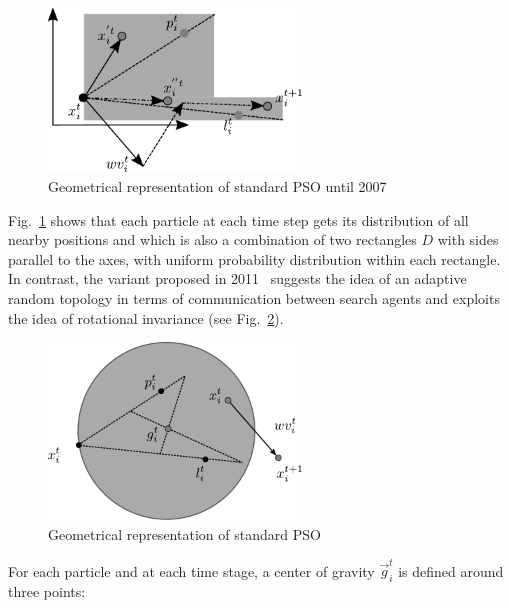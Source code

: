 \begin{figure} [H]
\centering
    \includegraphics[width=0.60\textwidth]{Part 2 - Search-Based Optimization/Particle Swarm Optimization/Images/SPSO2011-1.pdf}
    \caption{Geometrical representation of standard PSO until 2007}
    \label{fig:STANDARDPSO_1}
\end{figure}


    
Fig.~\ref{fig:STANDARDPSO_1} shows that each particle at each time step gets its distribution of all nearby positions and which is also a combination of two rectangles $D$ with sides parallel to the axes, with uniform probability distribution within each rectangle. In contrast, the variant proposed in 2011~\cite{clerc2012beyond} suggests the idea of an adaptive random topology in terms of communication between search agents and exploits the idea of rotational invariance (see Fig.~\ref{fig:STANDARDPSO}).


\begin{figure} [H]
\centering
    \includegraphics[width=0.60\textwidth]{Part 2 - Search-Based Optimization/Particle Swarm Optimization/Images/SPSO2011.pdf}
    \caption{Geometrical representation of standard PSO}
    \label{fig:STANDARDPSO}
\end{figure}



For each particle and at each time stage, a center of gravity ${\vec{g}}_i^t$ is defined around three points:

